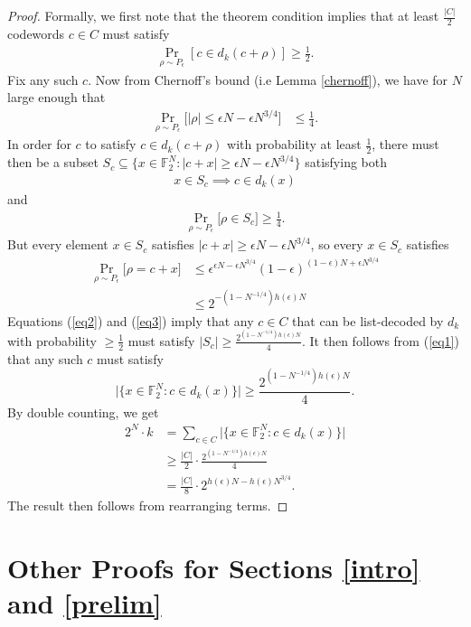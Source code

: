 \documentclass[12pt]{article}
\newcommand{\F}{\mathbb{F}}
\begin{document}
\begin{proof}
Formally, we first note that the theorem condition implies that at least $\frac{|C|}{2}$ codewords $c\in C$ must satisfy
\begin{align}\label{rewritecondition}
    \Pr_{\rho\sim P_\epsilon}[c\in d_k(c+\rho)]\geq \frac{1}{2}.
\end{align}
Fix any such $c$. Now from Chernoff's bound (i.e Lemma \ref{chernoff}), we have for $N$ large enough that
\begin{align*}
    \Pr_{\rho\sim P_\epsilon}\big[|\rho|\leq \epsilon N- \epsilon N^{3/4}\big]
    &\leq\frac{1}{4}.
\end{align*}
In order for $c$ to satisfy $c\in d_k(c+\rho)$ with probability at least $\frac{1}{2}$, there must then be a subset $S_c\subseteq\{x\in\F_2^N:|c+x|\geq\epsilon N-\epsilon N^{3/4}\} $ satisfying both
\begin{align}\label{eq1}
    x\in S_c\implies c\in d_k(x)
\end{align}
and
\begin{align}\label{eq2}
    \Pr_{\rho\sim P_\epsilon}\big[\rho\in S_c\big]\geq \frac{1}{4}.
\end{align}
But every element $x\in S_c$ satisfies $|c+x|\geq \epsilon N- \epsilon N^{3/4}$, so every $x\in S_c$ satisfies
\begin{align}\label{eq3}
\Pr_{\rho\sim P_\epsilon}\big[\rho=c+x\big]&\leq \epsilon^{\epsilon N-\epsilon N^{3/4}}(1-\epsilon)^{(1-\epsilon)N+\epsilon N^{3/4}}\nonumber\\
&\leq2^{-(1-N^{-1/4})h(\epsilon)N}
\end{align}
Equations (\ref{eq2}) and (\ref{eq3}) imply that any $c\in C$ that can be list-decoded by $d_k$ with probability $\geq \frac{1}{2}$ must satisfy $|S_c|\geq \frac{2^{(1-N^{-1/4})h(\epsilon)N}}{4}$. It then follows from (\ref{eq1}) that any such $c$ must satisfy
$$\big|\{x\in\F_2^N:c\in d_k(x)\}   \big|\geq \frac{2^{(1-N^{-1/4})h(\epsilon)N}}{4}.$$
By double counting, we get
\begin{align*}
    2^N\cdot k&=\sum_{c\in C}\big|\{x\in\F_2^N:c\in d_k(x)\}   \big|\\
    &\geq \frac{|C|}{2}\cdot \frac{2^{(1-N^{-1/4})h(\epsilon)N}}{4}\\
    &=\frac{|C|}{8}\cdot 2^{h(\epsilon)N-h(\epsilon)N^{3/4}}.
\end{align*}
The result then follows from rearranging terms.
\end{proof}

\section{Other Proofs for Sections \ref{intro} and \ref{prelim}}
\end{document}
